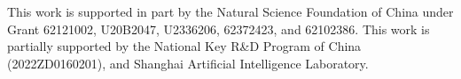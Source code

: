 \documentclass[sigconf]{acmart}
\begin{document}

\maketitle



\begin{acks}
This work is supported in part by the Natural Science Foundation of China under Grant 62121002, U20B2047, U2336206, 62372423, and 62102386. This work is partially supported by the National Key R\&D Program of China (2022ZD0160201), and Shanghai Artificial Intelligence Laboratory.
\end{acks}



\end{document}
